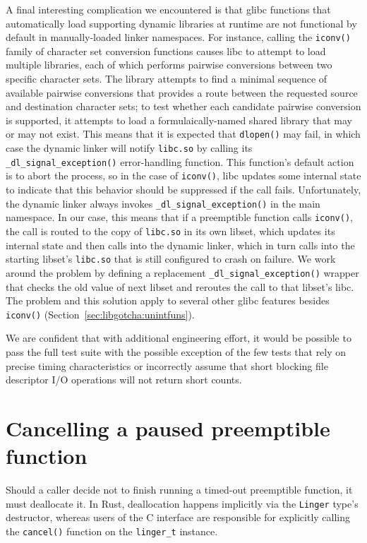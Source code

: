 A final interesting complication we encountered is that glibc functions that
automatically load supporting dynamic libraries at runtime are not functional by
default in manually-loaded linker namespaces.  For instance, calling the
\texttt{iconv()} family of character set conversion functions causes libc to attempt
to load multiple libraries, each of which performs pairwise conversions between two
specific character sets.  The library attempts to find a minimal sequence of
available pairwise conversions that provides a route between the requested source and
destination character sets; to test whether each candidate pairwise conversion is
supported, it attempts to load a formulaically-named shared library that may or may
not exist.  This means that it is expected that \texttt{dlopen()} may fail, in which
case the dynamic linker will notify \texttt{libc.so} by calling its
\texttt{\_dl\_signal\_exception()} error-handling function.  This function's default
action is to abort the process, so in the case of \texttt{iconv()}, libc updates some
internal state to indicate that this behavior should be suppressed if the call fails.
Unfortunately, the dynamic linker always invokes \texttt{\_dl\_signal\_exception()}
in the main namespace.  In our case, this means that if a preemptible function calls
\texttt{iconv()}, the call is routed to the copy of \texttt{libc.so} in its own
libset, which updates its internal state and then calls into the dynamic linker,
which in turn calls into the starting libset's \texttt{libc.so} that is still
configured to crash on failure.  We work around the problem by defining a replacement
\texttt{\_dl\_signal\_exception()} wrapper that checks the old value of next libset
and reroutes the call to that libset's libc.  The problem and this solution apply to
several other glibc features besides \texttt{iconv()}
(Section~\ref{sec:libgotcha:unintfuns}).

We are confident that with additional engineering effort, it would be possible to
pass the full test suite with the possible exception of the few tests that rely on
precise timing characteristics or incorrectly assume that short blocking file
descriptor I/O operations will not return short counts.


\section{Cancelling a paused preemptible function}
\label{sec:libinger:cancellation}

Should a caller decide not to finish running a timed-out preemptible function, it
must deallocate it.  In Rust, deallocation happens implicitly via the
\texttt{Linger} type's destructor, whereas users of the C interface are responsible
for explicitly calling the \texttt{cancel()} function on the \texttt{linger\_t}
instance.


